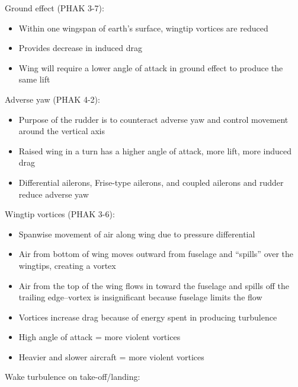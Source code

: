 Ground effect (PHAK 3-7):

\begin{itemize}
  \item Within one wingspan of earth's surface, wingtip vortices are reduced

  \item Provides decrease in induced drag

  \item Wing will require a lower angle of attack in ground effect to produce
    the same lift
\end{itemize}

Adverse yaw (PHAK 4-2):

\begin{itemize}
  \item Purpose of the rudder is to counteract adverse yaw and control movement
    around the vertical axis

  \item Raised wing in a turn has a higher angle of attack, more lift, more
    induced drag

  \item Differential ailerons, Frise-type ailerons, and coupled ailerons and
    rudder reduce adverse yaw
\end{itemize}


Wingtip vortices (PHAK 3-6):

\begin{itemize}
    \item Spanwise movement of air along wing due to pressure differential

    \item Air from bottom of wing moves outward from fuselage and ``spills''
      over the wingtips, creating a vortex

    \item Air from the top of the wing flows in toward the fuselage and spills
      off the trailing edge--vortex is insignificant because fuselage limits the
      flow

    \item Vortices increase drag because of energy spent in producing turbulence

    \item High angle of attack = more violent vortices

    \item Heavier and slower aircraft = more violent vortices
\end{itemize}

Wake turbulence on take-off/landing:

